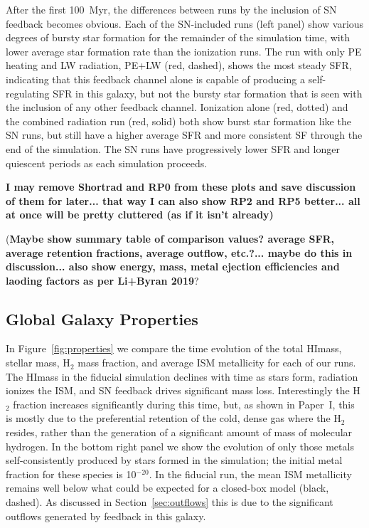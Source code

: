 \documentclass[twocolumn]{aastex62}
\newcommand{\radstyle}{red, solid}
\newcommand{\ionstyle}{red, dotted}
\newcommand{\pelwstyle}{red, dashed}
\newcommand{\HI}{HI}
\begin{document}
After the first 100~Myr, the differences between runs by the inclusion of SN feedback becomes obvious. Each of the SN-included runs (left panel) show various degrees of bursty star formation for the remainder of the simulation time, with lower average star formation rate than the ionization runs. The run with only PE heating and LW radiation, PE+LW (\pelwstyle), shows the most steady SFR, indicating that this feedback channel alone is capable of producing a self-regulating SFR in this galaxy, but not the bursty star formation that is seen with the inclusion of any other feedback channel. Ionization alone (\ionstyle) and the combined radiation run (\radstyle) both show burst star formation like the SN runs, but still have a higher average SFR and more consistent SF through the end of the simulation. The SN runs have progressively lower SFR and longer quiescent periods as each simulation proceeds.

\textbf{I may remove Shortrad and RP0 from these plots and save discussion of them for later... that way I can also show RP2 and RP5 better... all at once will be pretty cluttered (as if it isn't already)}

(\textbf{Maybe show summary table of comparison values? average SFR, average retention fractions, average outflow, etc.?... maybe do this in discussion... also show energy, mass, metal ejection efficiencies and laoding factors as per Li+Byran 2019}?

\subsection{Global Galaxy Properties}
\label{sec:galaxy properties}

In Figure~\ref{fig:properties} we compare the time evolution of the total \HI mass, stellar mass, H$_2$ mass fraction, and average ISM metallicity for each of our runs. The \HI mass in the fiducial simulation declines with time as stars form, radiation ionizes the ISM, and SN feedback drives significant mass loss. Interestingly the H$_2$ fraction increases significantly during this time, but, as shown in Paper~I, this is mostly due to the preferential retention of the cold, dense gas where the H$_2$ resides, rather than the generation of a significant amount of mass of molecular hydrogen. In the bottom right panel we show the evolution of only those metals self-consistently produced by stars formed in the simulation; the initial metal fraction for these species is 10$^{-20}$. In the fiducial run, the mean ISM metallicity remains well below what could be expected for a closed-box model (black, dashed). As discussed in Section~\ref{sec:outflows} this is due to the significant outflows generated by feedback in this galaxy. 
\end{document}
